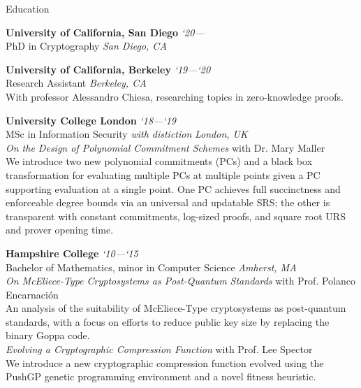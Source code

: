 \documentclass{cv}
\begin{document}
\begin{rSection}{Education}

\textbf{University of California, San Diego} \hfill \emph{`20---}  \\
PhD in Cryptography \hfill \emph{San Diego, CA}

\textbf{University of California, Berkeley} \hfill \emph{`19---`20} \\
Research Assistant \hfill \emph{Berkeley, CA} \\
{\small With professor Alessandro Chiesa, researching topics in zero-knowledge proofs.}

\textbf{University College London} \hfill \emph{`18---`19}  \\
MSc in Information Security \emph{with distiction} \hfill \emph{London, UK} \\
\emph{On the Design of Polynomial Commitment Schemes} with Dr. Mary Maller \\
{\small We introduce two new polynomial commitments (PCs) and a black box transformation for evaluating multiple PCs at multiple points given a PC supporting evaluation at a single point. One PC achieves full succinctness and enforceable degree bounds via an universal and updatable SRS; the other is transparent with constant commitments, log-sized proofs, and square root URS and prover opening time.}

\textbf{Hampshire College} \hfill \emph{`10---`15} \\
Bachelor of Mathematics, minor in Computer Science \hfill \emph{Amherst, MA} \\
\emph{On McEliece-Type Cryptosystems as Post-Quantum Standards} with Prof. Polanco Encarnación \\
{\small An analysis of the suitability of McEliece-Type cryptosystems as post-quantum standards, with a focus on efforts to reduce public key size by replacing the binary Goppa code.} \\
\emph{Evolving a Cryptographic Compression Function} with Prof. Lee Spector \\
{\small We introduce a new cryptographic compression function evolved using the PushGP genetic programming environment and a novel fitness heuristic.}

\end{rSection}
\end{document}
